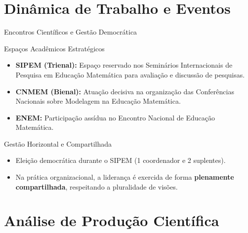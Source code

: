 \documentclass[10pt, aspectratio=169]{beamer}
\begin{document}
\section{Dinâmica de Trabalho e Eventos}

\begin{frame}{Encontros Científicos e Gestão Democrática}
    \transboxout[duration=0.4]
    \begin{block}{Espaços Acadêmicos Estratégicos}
        \begin{itemize}
            \item \textbf{SIPEM (Trienal):} Espaço reservado nos Seminários Internacionais de Pesquisa em Educação Matemática para avaliação e discussão de pesquisas.
            \pause
            \item \textbf{CNMEM (Bienal):} Atuação decisiva na organização das Conferências Nacionais sobre Modelagem na Educação Matemática.
            \pause
            \item \textbf{ENEM:} Participação assídua no Encontro Nacional de Educação Matemática.
        \end{itemize}
    \end{block}
    \pause
    \begin{exampleblock}{Gestão Horizontal e Compartilhada}
        \begin{itemize}
            \item Eleição democrática durante o SIPEM (1 coordenador e 2 suplentes).
            \item Na prática organizacional, a liderança é exercida de forma \textbf{plenamente compartilhada}, respeitando a pluralidade de visões.
        \end{itemize}
    \end{exampleblock}
\end{frame}

\section{Análise de Produção Científica}
\end{document}
